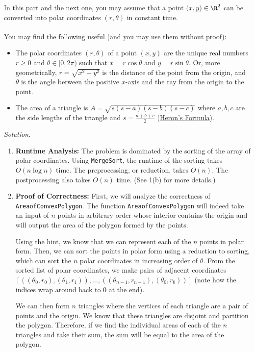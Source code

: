 \documentclass[11pt]{article}
\begin{document}
\begin{enumerate}
\begin{enumerate}
        In this part and the next one, you may assume that a point $(x,y)\in \R^2$ can be converted into polar coordinates $(r,\theta)$ in constant time. 
        \\\\
        You may find the following useful (and you may use them without proof):
        \begin{itemize}
            \item The polar coordinates $(r,\theta)$ of a point $(x,y)$ are the unique real numbers $r\geq 0$ and $\theta\in [0,2\pi)$ such that $x=r\cos \theta$ and $y=r\sin \theta$. Or, more geometrically, $r=\sqrt{x^2+y^2}$ is the distance of the point from the origin, and $\theta$ is the angle between the positive $x$-axis and the ray from the origin to the point.
            \item The area of a triangle is $A = \sqrt{s(s-a)(s-b)(s-c)}$ where $a, b, c$ are the side lengths of the triangle and $s = \frac{a + b + c}{2}$ (\href{https://en.wikipedia.org/wiki/Heron\%27s_formula}{Heron's Formula}).
        \end{itemize}
        \textit{Solution.} 
        \begin{enumerate}
            \item \textbf{Runtime Analysis:} The problem is dominated by the sorting of the array of polar coordinates. Using \texttt{MergeSort}, the runtime of the sorting takes $O(n\log n)$ time. The preprocessing, or reduction, takes $O(n)$. The postprocessing also takes $O(n)$ time. (See 1(b) for more details.)
            \item \textbf{Proof of Correctness:} First, we will analyze the correctness of \texttt{AreaofConvexPolygon}. The function \texttt{AreaofConvexPolygon} will indeed take an input of $n$ points in arbitrary order whose interior contains the origin and will output the area of the polygon formed by the points.

            Using the hint, we know that we can represent each of the $n$ points in polar form. Then, we can sort the points in polar form using a reduction to sorting, which can sort the $n$ polar coordinates in increasing order of $\theta$. From the sorted list of polar coordinates, we make pairs of adjacent coordinates $[((\theta_0, r_0), (\theta_1, r_1)), \dots, ((\theta_{n-1}, r_{n-1}), (\theta_0, r_0))]$ (note how the indices wrap around back to $0$ at the end). 

            We can then form $n$ triangles where the vertices of each triangle are a pair of points and the origin. We know that these triangles are disjoint and partition the polygon. Therefore, if we find the individual areas of each of the $n$ triangles and take their sum, the sum will be equal to the area of the polygon.


\end{enumerate}
\end{enumerate}
\end{enumerate}
\end{document}
